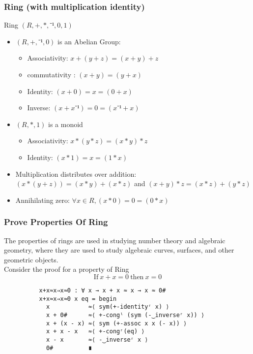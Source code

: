 \documentclass[xcolor={dvipsnames}]{beamer}
\begin{document}

  \begin{frame}[fragile]
    \frametitle{Ring (with multiplication identity)}  

    Ring $(R,+,*,⁻¹,0,1)$
        \begin{itemize}
            \item $(R,+,⁻¹,0)$ is an Abelian Group:
             \begin{itemize}
              \item Associativity: $ x + (y + z) = (x + y) + z$
              \item commutativity : $ (x + y) = (y + x)$
              \item Identity: $ (x + 0) = x = (0 + x)$
              \item Inverse: $ (x + x⁻¹) = 0 = (x⁻¹ + x)$
            \end{itemize}
            \item $(R,*,1)$ is a monoid
            \begin{itemize}
              \item Associativity: $ x * (y * z) = (x * y) * z$
              \item Identity: $ (x * 1) = x = (1 * x)$
            \end{itemize}
            \item Multiplication distributes over addition: \( (x * (y + z)) = (x * y) + (x
            * z)\) and \( (x + y) * z = (x * z) + (y * z) \)
            \item Annihilating zero: \(\forall x \in R, (x * 0) = 0 = (0 * x)\)
          \end{itemize}
  \end{frame}


  \begin{frame}[fragile]
    \frametitle{Prove Properties Of Ring}
    The properties of rings are used in studying number theory and algebraic
    geometry, where they are used to study algebraic curves, surfaces, and
    other geometric objects.\\

    Consider the proof for a property of Ring
        \[\text{If}\ x + x =0 \ \text{then}\ x=0\]

        \begin{verbatim}
          x+x≈x⇒x≈0 : ∀ x → x + x ≈ x → x ≈ 0#
          x+x≈x⇒x≈0 x eq = begin
            x           ≈⟨ sym(+-identityʳ x) ⟩
            x + 0#      ≈⟨ +-congˡ (sym (-‿inverseʳ x)) ⟩
            x + (x - x) ≈⟨ sym (+-assoc x x (- x)) ⟩
            x + x - x   ≈⟨ +-congʳ(eq) ⟩
            x - x       ≈⟨ -‿inverseʳ x ⟩
            0#          ∎
          \end{verbatim}

  \end{frame}
\end{document}
